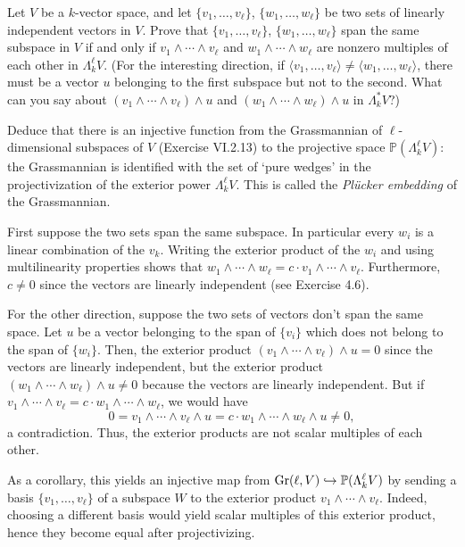 \documentclass[../../master.tex]{subfiles}
\begin{document}
\begin{problem}
    Let $V$ be a $k$-vector space, and let $\{v_1, \ldots, v_\ell\}$, $\{w_1, \ldots, w_\ell\}$ be two sets of linearly independent vectors in $V$.
    Prove that $\{v_1, \ldots, v_\ell\}$, $\{w_1, \ldots, w_\ell\}$ span the same subspace in $V$ if and only if $v_1 \wedge \cdots \wedge v_\ell$ and $w_1 \wedge \cdots \wedge w_\ell$ are nonzero multiples of each other in $\Lambda_k^{\ell}V$.
    (For the interesting direction, if $\langle v_1, \ldots, v_\ell \rangle \neq \langle w_1, \ldots, w_\ell \rangle$, there must be a vector $u$ belonging to the first subspace but not to the second.
    What can you say about $(v_1 \wedge \cdots \wedge v_\ell) \wedge u$ and $(w_1 \wedge \cdots \wedge w_\ell) \wedge u$ in $\Lambda_k^{*}V$?)

    Deduce that there is an injective function from the Grassmannian of $\ell$-dimensional subspaces of $V$ (Exercise VI.2.13) to the projective space $\mathbb{P}(\Lambda_k^{\ell}V)$:
    the Grassmannian is identified with the set of `pure wedges' in the projectivization of the exterior power $\Lambda_k^{\ell}V$.
    This is called the \textit{Pl\"ucker embedding} of the Grassmannian.
\end{problem}

\begin{solution}
    First suppose the two sets span the same subspace.
    In particular every $w_i$ is a linear combination of the $v_k$.
    Writing the exterior product of the $w_i$ and using multilinearity properties shows that $w_1 \wedge \cdots \wedge w_\ell = c \cdot v_1 \wedge \cdots \wedge v_\ell$.
    Furthermore, $c \neq 0$ since the vectors are linearly independent (see Exercise 4.6).

    For the other direction, suppose the two sets of vectors don't span the same space.
    Let $u$ be a vector belonging to the span of $\{v_i\}$ which does not belong to the span of $\{w_i\}$.
    Then, the exterior product $(v_1 \wedge \cdots \wedge v_\ell) \wedge u = 0$ since the vectors are linearly independent, but the exterior product $(w_1 \wedge \cdots \wedge w_\ell) \wedge u \neq 0$ because the vectors are linearly independent.
    But if $v_1 \wedge \cdots \wedge v_\ell = c \cdot w_1 \wedge \cdots \wedge w_\ell$, we would have
    \[
        0 = v_1 \wedge \cdots \wedge v_\ell \wedge u = c \cdot w_1 \wedge \cdots \wedge w_\ell \wedge u \neq 0,
    \]
    a contradiction.
    Thus, the exterior products are not scalar multiples of each other.

    As a corollary, this yields an injective map from $\operatorname{Gr}(\ell, V) \hookrightarrow \mathbb{P}(\Lambda_k^{\ell}V)$ by sending a basis $\{v_1, \ldots, v_\ell\}$ of a subspace $W$ to the exterior product $v_1 \wedge \cdots \wedge v_\ell$.
    Indeed, choosing a different basis would yield scalar multiples of this exterior product, hence they become equal after projectivizing.
\end{solution}
\end{document}
